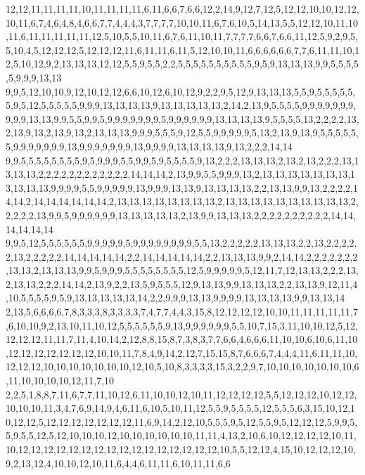 12,12,11,11,11,11,10,11,11,11,11,6,11,6,6,7,6,6,12,2,14,9,12,7,12,5,12,12,10,10,12,12,10,11,6,7,4,6,4,8,4,6,6,7,7,4,4,4,3,7,7,7,7,10,10,11,6,7,6,10,5,14,13,5,5,12,12,10,11,10,11,6,11,11,11,11,11,12,5,10,5,5,10,11,6,7,6,11,10,11,7,7,7,7,6,6,7,6,6,11,12,5,9,2,9,5,5,10,4,5,12,12,12,5,12,12,12,11,6,11,11,6,11,5,12,10,10,11,6,6,6,6,6,6,7,7,6,11,11,10,12,5,10,12,9,2,13,13,13,12,12,5,5,9,5,5,2,2,5,5,5,5,5,5,5,5,5,5,9,5,9,13,13,13,9,9,5,5,5,5,5,9,9,9,13,13
9,9,5,12,10,10,9,12,10,12,12,6,6,10,12,6,10,12,9,2,2,9,5,12,9,13,13,13,5,5,9,5,5,5,5,5,5,9,5,12,5,5,5,5,5,9,9,9,13,13,13,13,9,13,13,13,13,13,2,14,2,13,9,5,5,5,5,9,9,9,9,9,9,9,9,9,9,13,13,9,9,5,5,9,9,5,9,9,9,9,9,9,9,5,9,9,9,9,9,9,13,13,13,13,9,5,5,5,5,13,2,2,2,2,13,2,13,9,13,2,13,9,13,2,13,13,13,9,9,9,5,5,5,9,12,5,5,9,9,9,9,9,5,13,2,13,9,13,9,5,5,5,5,5,5,9,9,9,9,9,9,9,13,9,9,9,9,9,9,9,13,9,9,9,9,13,13,13,13,9,13,2,2,2,14,14
9,9,5,5,5,5,5,5,5,5,9,5,9,9,9,5,5,9,9,5,9,5,5,5,5,9,13,2,2,2,13,13,13,2,13,2,13,2,2,2,13,13,13,13,2,2,2,2,2,2,2,2,2,2,2,2,14,14,14,2,13,9,9,5,5,9,9,9,13,2,13,13,13,13,13,13,13,13,13,13,13,9,9,9,9,5,5,9,9,9,9,9,13,9,9,9,13,13,9,13,13,13,13,2,2,13,13,9,9,13,2,2,2,2,14,14,2,14,14,14,14,14,14,2,13,13,13,13,13,13,13,13,2,13,13,13,13,13,13,13,13,13,13,2,2,2,2,2,13,9,9,5,9,9,9,9,9,9,13,13,13,13,13,2,13,9,9,13,13,13,2,2,2,2,2,2,2,2,2,2,14,14,14,14,14,14
9,9,5,12,5,5,5,5,5,5,9,9,9,9,9,5,9,9,9,9,9,9,9,9,5,5,13,2,2,2,2,2,13,13,13,2,2,13,2,2,2,2,2,13,2,2,2,2,2,14,14,14,14,14,2,2,14,14,14,14,14,2,2,13,13,13,9,9,2,14,14,2,2,2,2,2,2,2,13,13,2,13,13,13,9,9,5,9,9,9,5,5,5,5,5,5,5,5,12,5,9,9,9,9,9,5,12,11,7,12,13,13,2,2,2,13,2,13,13,2,2,2,14,14,2,13,9,2,2,13,5,9,5,5,5,12,9,13,13,9,9,13,13,13,2,2,13,13,9,12,11,4,10,5,5,5,5,9,5,9,13,13,13,13,13,14,2,2,9,9,9,13,13,9,9,9,9,13,13,13,13,9,9,13,13,14
2,13,5,6,6,6,6,7,8,3,3,3,8,3,3,3,3,7,4,7,7,4,4,3,15,8,12,12,12,12,10,10,11,11,11,11,11,7,6,10,10,9,2,13,10,11,10,12,5,5,5,5,5,5,9,13,9,9,9,9,9,9,5,5,10,7,15,3,11,10,10,12,5,12,12,12,12,11,11,7,11,4,10,14,2,12,8,8,15,8,7,3,8,3,7,7,6,6,4,6,6,6,11,10,10,6,10,6,11,10,12,12,12,12,12,12,12,10,10,11,7,8,4,9,14,2,12,7,15,15,8,7,6,6,6,7,4,4,4,11,6,11,11,10,12,12,12,10,10,10,10,10,10,10,12,10,5,10,8,3,3,3,3,15,3,2,2,9,7,10,10,10,10,10,10,10,6,11,10,10,10,10,12,11,7,10
2,2,5,1,8,8,7,11,6,7,7,11,10,12,6,11,10,10,12,10,11,12,12,12,12,5,5,12,12,12,10,12,12,10,10,10,11,3,4,7,6,9,14,9,4,6,11,6,10,5,10,11,12,5,5,9,5,5,5,5,12,5,5,5,6,3,15,10,12,10,12,12,5,12,12,12,12,12,12,12,11,6,9,14,2,12,10,5,5,5,9,5,12,5,5,9,5,12,12,12,5,9,9,5,5,9,5,5,12,5,12,10,10,10,12,10,10,10,10,10,10,11,11,4,13,2,10,6,10,12,12,12,12,10,11,10,12,12,12,12,12,12,12,12,12,12,12,12,12,12,12,12,10,5,5,12,12,4,15,10,12,12,12,10,9,2,13,12,4,10,10,12,10,11,6,4,4,6,11,11,6,10,11,11,6,6

